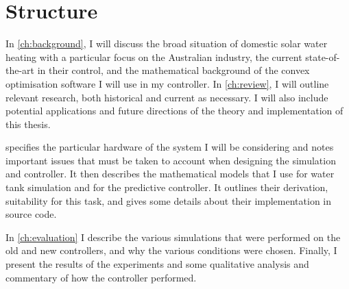 \section{Structure}

In \autoref{ch:background}, I will discuss the broad situation of domestic solar water heating with a particular focus on the Australian industry, the current state-of-the-art in their control, and the mathematical background of the convex optimisation software I will use in my controller.
In \autoref{ch:review}, I will outline relevant research, both historical and current as necessary.
I will also include potential applications and future directions of the theory and implementation of this thesis.

 specifies the particular hardware of the system I will be considering and notes important issues that must be taken to account when designing the simulation and controller.
It then describes the mathematical models that I use for water tank simulation and for the predictive controller.
It outlines their derivation, suitability for this task, and gives some details about their implementation in source code.

In \autoref{ch:evaluation} I describe the various simulations that were performed on the old and new controllers, and why the various conditions were chosen.
Finally, I present the results of the experiments and some qualitative analysis and commentary of how the controller performed.
